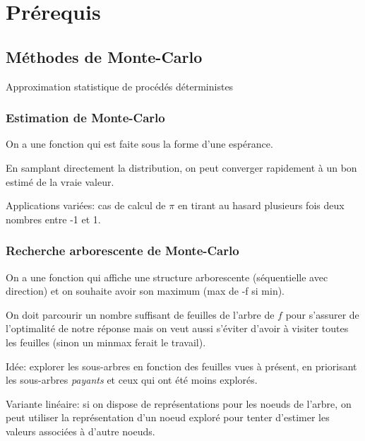 \chapter{Prérequis}     %
\label{chap:montecarlo}                   %


\section{Méthodes de Monte-Carlo}

Approximation statistique de procédés déterministes

\subsection{Estimation de Monte-Carlo}

On a une fonction qui est faite sous la forme d'une espérance.

En samplant directement la distribution, on peut converger rapidement
à un bon estimé de la vraie valeur.

Applications variées: cas de calcul de $\pi$ en tirant au hasard plusieurs
fois deux nombres entre -1 et 1.

\subsection{Recherche arborescente de Monte-Carlo}

On a une fonction qui affiche une structure arborescente
(séquentielle avec direction) et on souhaite avoir son maximum (max de -f si min).

On doit parcourir un nombre suffisant de feuilles de l'arbre de $f$ pour
s'assurer de l'optimalité de notre réponse mais on veut aussi s'éviter d'avoir
à visiter toutes les feuilles (sinon un minmax ferait le travail).

Idée: explorer les sous-arbres en fonction des feuilles vues à présent,
en priorisant les sous-arbres \textit{payants} et ceux qui ont été
moins explorés.

Variante linéaire: si on dispose de représentations pour les noeuds de
l'arbre, on peut utiliser la représentation d'un noeud exploré pour
tenter d'estimer les valeurs associées à d'autre noeuds.


